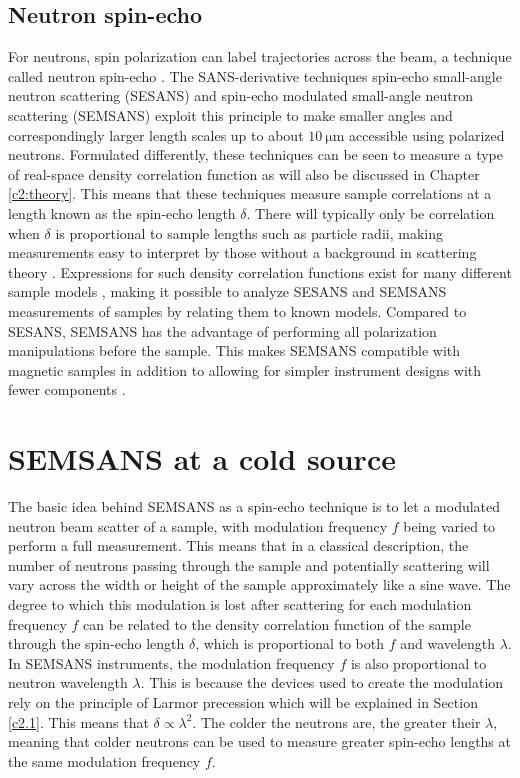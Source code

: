 \subsection{Neutron spin-echo}
For neutrons, spin polarization can label trajectories across the beam, a technique called neutron spin-echo \cite{mezei1972}. The SANS-derivative techniques spin-echo small-angle neutron scattering (SESANS) \cite{rekveldt1996} and spin-echo modulated small-angle neutron scattering (SEMSANS) \cite{bouwman2009}\cite{bouwman2011} exploit this principle to make smaller angles and correspondingly larger length scales up to about $\SI{10}{\micro\meter}$ accessible using polarized neutrons. Formulated differently, these techniques can be seen to measure a type of real-space density correlation function \cite{krouglov2003} as will also be discussed in Chapter \ref{c2:theory}. This means that these techniques measure sample correlations at a length known as the spin-echo length $\delta$. There will typically only be correlation when $\delta$ is proportional to sample lengths such as particle radii, making measurements easy to interpret by those without a background in scattering theory \cite{bouwman2021}. Expressions for such density correlation functions exist for many different sample models \cite{andersson2008}, making it possible to analyze SESANS and SEMSANS measurements of samples by relating them to known models. Compared to SESANS, SEMSANS has the advantage of performing all polarization manipulations before the sample. This makes SEMSANS compatible with magnetic samples \cite{li2021} in addition to allowing for simpler instrument designs with fewer components \cite{bouwman2009}.

\section{SEMSANS at a cold source}
\label{c1.2}

The basic idea behind SEMSANS as a spin-echo technique is to let a modulated neutron beam scatter of a sample, with modulation frequency $f$ being varied to perform a full measurement. This means that in a classical description, the number of neutrons passing through the sample and potentially scattering will vary across the width or height of the sample approximately like a sine wave. The degree to which this modulation is lost after scattering for each modulation frequency $f$ can be related to the density correlation function of the sample through the spin-echo length $\delta$, which is proportional to both $f$ and wavelength $\lambda$. In SEMSANS instruments, the modulation frequency $f$ is also proportional to neutron wavelength $\lambda$. This is because the devices used to create the modulation rely on the principle of Larmor precession which will be explained in Section \ref{c2.1}. This means that $\delta\propto\lambda^2$. The colder the neutrons are, the greater their $\lambda$, meaning that colder neutrons can be used to measure greater spin-echo lengths at the same modulation frequency $f$. 

